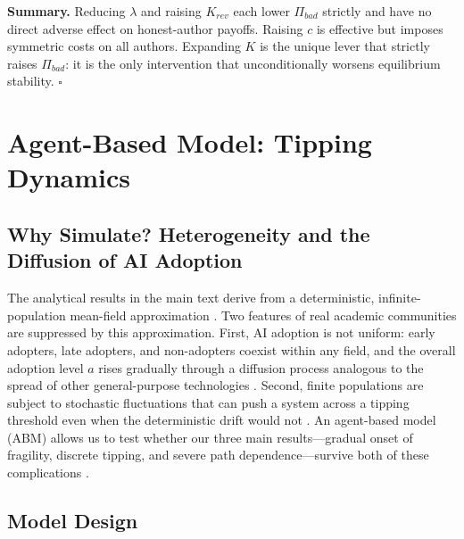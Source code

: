 \documentclass{article}
\begin{document}
\medskip\noindent\textbf{Summary.}
Reducing $\lambda$ and raising $K_{\mathit{rev}}$ each lower $\Pi_{\mathit{bad}}$ strictly and have no direct adverse effect on honest-author payoffs.
Raising $c$ is effective but imposes symmetric costs on all authors.
Expanding $K$ is the unique lever that strictly raises $\Pi_{\mathit{bad}}$: it is the only intervention that unconditionally worsens equilibrium stability.
\hfill$\square$


\section{Agent-Based Model: Tipping Dynamics}
\label{app:abm}

\subsection{Why Simulate? Heterogeneity and the Diffusion of AI Adoption}

The analytical results in the main text derive from a deterministic, infinite-population mean-field approximation \citep{Hofbauer1998}.
Two features of real academic communities are suppressed by this approximation.
First, AI adoption is not uniform: early adopters, late adopters, and non-adopters coexist within any field, and the overall adoption level $a$ rises gradually through a diffusion process analogous to the spread of other general-purpose technologies \citep{Rogers2003, Bass1969}.
Second, finite populations are subject to stochastic fluctuations that can push a system across a tipping threshold even when the deterministic drift would not \citep{Nowak2006, Traulsen2009}.
An agent-based model (ABM) allows us to test whether our three main results---gradual onset of fragility, discrete tipping, and severe path dependence---survive both of these complications \citep{Bonabeau2002, Epstein1996}.

\subsection{Model Design}
\end{document}
